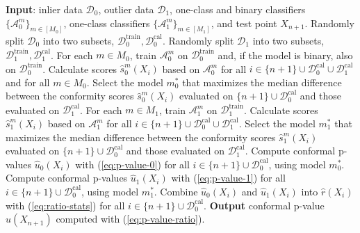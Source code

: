 \documentclass[11pt]{article}
\begin{document}
\begin{algorithm}[H]
    \caption{Integrative conformal p-values with automatic model selection}
    \label{alg:weighted-pvalues-tuning}
    \begin{algorithmic}[1]
        \State \textbf{Input}: inlier data $\mathcal{D}_0$, outlier data $\mathcal{D}_1$, one-class and binary classifiers $\{\mathcal{A}_0^m\}_{m \in [M_0]}$, one-class classifiers $\{\mathcal{A}_1^m\}_{m \in [M_1]}$, and test point $X_{n+1}$.
        \State Randomly split $\mathcal{D}_0$ into two subsets, $\mathcal{D}_0^{\mathrm{train}}, \mathcal{D}_0^{\mathrm{cal}}$.
        \State Randomly split $\mathcal{D}_1$ into two subsets, $\mathcal{D}_1^{\mathrm{train}}, \mathcal{D}_1^{\mathrm{cal}}$.
        \State For each $m \in M_0$, train $\mathcal{A}_0^m$ on $\mathcal{D}^{\mathrm{train}}_0$ and, if the model is binary, also on $\mathcal{D}^{\mathrm{train}}_0$.
        \State Calculate scores $\hat{s}^m_0(X_i)$ based on $\mathcal{A}^m_0$ for all $i \in \{n+1\} \cup \mathcal{D}^{\mathrm{cal}}_0 \cup \mathcal{D}^{\mathrm{cal}}_1$ and for all $m \in M_0$.
        \State \label{select}Select the model $m_0^*$ that maximizes the median difference between the conformity scores $\hat{s}^m_0(X_i)$ evaluated on $\{n+1\} \cup \mathcal{D}^{\mathrm{cal}}_0 $ and those evaluated on $\mathcal{D}^{\mathrm{cal}}_1 $.
        \State For each $m \in M_1$, train $\mathcal{A}_1^m$ on $\mathcal{D}^{\mathrm{train}}_1$.
        \State Calculate scores $\hat{s}^m_1(X_i)$ based on $\mathcal{A}^m_1$ for all $i \in \{n+1\} \cup \mathcal{D}^{\mathrm{cal}}_0 \cup \mathcal{D}^{\mathrm{cal}}_1$.
        \State \label{select}Select the model $m_1^*$ that maximizes the median difference between the conformity scores $\hat{s}^m_1(X_i)$ evaluated on $\{n+1\} \cup \mathcal{D}^{\mathrm{cal}}_0 $ and those evaluated on $\mathcal{D}^{\mathrm{cal}}_1 $.
        \State Compute conformal p-values $\hat{u}_0(X_i)$ with (\ref{eq:p-value-0}) for all $i \in \{n+1\} \cup \mathcal{D}^{\mathrm{cal}}_0$, using model $m_0^*$.
        \State Compute conformal p-values $\hat{u}_1(X_i)$ with (\ref{eq:p-value-1}) for all $i \in \{n+1\} \cup \mathcal{D}^{\mathrm{cal}}_0$, using model $m_1^*$.
        \State Combine $\hat{u}_0(X_i)$ and $\hat{u}_1(X_i)$ into $\hat{r}(X_i)$ with (\ref{eq:ratio-stats}) for all $i \in \{n+1\} \cup \mathcal{D}^{\mathrm{cal}}_0$.
        \State \textbf{Output} conformal p-value $\hat{u}(X_{n+1})$ computed with (\ref{eq:p-value-ratio}).
    \end{algorithmic}
\end{algorithm}
\end{document}
